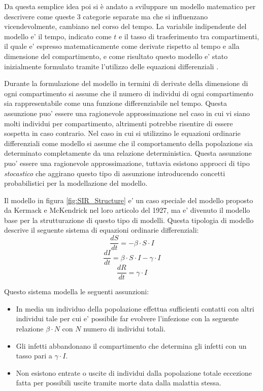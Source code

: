 Da questa semplice idea poi si è andato a sviluppare un modello
matematico per descrivere come queste 3 categorie separate ma 
che si influenzano vicendevolmente, cambiano nel corso del tempo.
La variabile indipendente del modello e' il tempo, indicato come $t$ e il 
tasso di trasferimento tra compartimenti, il quale e' espresso matematicamente come 
derivate rispetto al tempo e alla dimensione del compartimento, e come risultato questo 
modello e' stato inizialmente formulato tramite l'utilizzo delle equazioni differenziali
\cite{Brauer2008}. 

Durante la formulazione del modello in termini di derivate della dimensione di ogni compartimento
si assume che il numero di individui di ogni compartimento sia rappresentabile come una funzione 
differenziabile nel tempo. Questa assunzione puo' essere una ragionevole approssimazione nel caso 
in cui vi siano molti individui per compartimento, altrimenti potrebbe risentire di essere sospetta
in caso contrario. Nel caso in cui si utilizzino le equazioni ordinarie differenziali come modello 
si assume che il comportamento della popolazione sia determinato completamente da una relazione deterministica. 
Questa assunzione puo' essere una ragionevole approssimazione, tuttavia esistono approcci di tipo 
\emph{stocastico} che aggirano questo tipo di assunzione introducendo concetti probabilistici per
la modellazione del modello.

Il modello in figura \ref{fig:SIR_Structure} e' un caso speciale del modello proposto da Kermack e McKendrick 
nel loro articolo del 1927, ma e' divenuto il modello base per la strutturazione di questo tipo di modelli.
Questa tipologia di modello descrive il seguente sistema di equazioni ordinarie differenziali:
$$\frac{dS}{dt} = -\beta \cdot S \cdot I$$
$$\frac{dI}{dt} = \beta \cdot S \cdot I - \gamma \cdot I$$
$$\frac{dR}{dt} = \gamma \cdot I$$

Questo sistema modella le seguenti assunzioni: 
\begin{itemize}
    \item In media un individuo della popolazione effettua sufficienti contatti con altri individui tale per cui 
    e' possibile far evolvere l'infezione con la seguente relazione $\beta \cdot N$ con $N$ numero di individui totali. 
    \item Gli infetti abbandonano il compartimento che determina gli infetti con un tasso pari a $\gamma \cdot I$.
    \item Non esistono entrate o uscite di individui dalla popolazione totale eccezione fatta per possibili uscite tramite morte
    data dalla malattia stessa.
\end{itemize}

